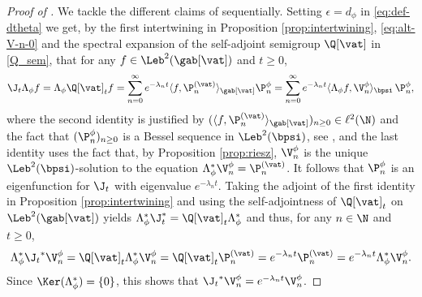 \begin{proof}[Proof of ]
We tackle the different claims of  sequentially. Setting $\epsilon = d_\phi$ in \eqref{eq:def-dtheta} we get, by the first intertwining in Proposition \ref{prop:intertwining}, \eqref{eq:alt-V-n-0}
and the spectral expansion of the self-adjoint semigroup $\Q[\vat]$ in \eqref{Q_sem}, that for any $f \in \Leb^2(\gab[\vat])$ and $t \geq 0$,
\begin{align*}
\J_t \Lambda_\phi f = \Lambda_\phi \Q[\vat]_t f = \sum_{n=0}^\infty e^{-\lambda_n t} \langle f, \P_n^{(\vat)} \rangle_{\gab[\vat]} \P_n^\phi = \sum_{n=0}^\infty e^{-\lambda_n t} \langle \Lambda_\phi f, \V_n^\phi \rangle_{\bpsi}\, \P_n^\phi,
\end{align*}
where the second identity is justified by $(\langle f, \P_n^{(\vat)}\rangle_{\gab[\vat]})_{n \geq 0} \in \ell^2(\N)$ and the fact that $(\P_n^\phi)_{n \geq 0}$ is a Bessel sequence in $\Leb^2(\bpsi)$, see \cite[Th.\,3.1.3]{Christensen2003a}, and the last identity uses the fact that, by Proposition \ref{prop:riesz}, $\V_n^\phi$ is the unique $\Leb^2(\bpsi)$-solution to the equation $\Lambda_\phi^* \V_n^\phi = \P_n^{(\vat)}$. It follows that $\P_n^\phi$ is an eigenfunction for $\J_t$ with eigenvalue $e^{-\lambda_n t}$. Taking the adjoint of the first identity in Proposition \ref{prop:intertwining}
and using the self-adjointness of $\Q[\vat]_t$ on $\Leb^2(\gab[\vat])$ yields $\Lambda_\phi^* \J_t^* = \Q[\vat]_t \Lambda_\phi^*$ and thus, for any $n \in \N$ and $t \geq 0$,
\begin{equation*}
\Lambda_\phi^* {\J_t}^* \V_n^\phi = \Q[\vat]_t \Lambda_\phi^* \V_n^\phi = \Q[\vat]_t \P_n^{(\vat)} = e^{-\lambda_n t} \P_n^{(\vat)} = e^{-\lambda_n t}\Lambda_\phi^* \V_n^\phi.
\end{equation*}
Since $\Ker(\Lambda_\phi^*) = \{0\}$, this shows that ${\J_t}^* \V_n^\phi = e^{-\lambda_n t} \V_n^\phi$.


\end{proof}
